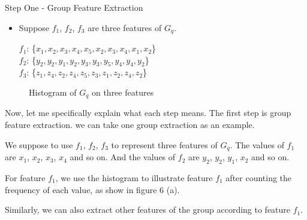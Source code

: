 \documentclass[
 size=14pt,
 paper=smartboard,  %
 mode=present, 		%
 display=slides, 	%
 style=tuliplab,  	%
 pauseslide,
 fleqn,leqno]{powerdot}
\begin{document}
\begin{slide}{Step One - Group Feature Extraction}
\begin{itemize}
\item
\smallskip
Suppose $f_1$, $f_2$, $f_3$ are three features of $G_q$.

$f_1$: \{$x_1, x_2, x_3, x_4, x_5, x_2, x_3, x_4, x_1, x_2$\} \\

$f_2$: \{$y_2, y_2, y_1, y_2, y_3, y_3, y_5, y_4, y_4, y_2$\} \\

$f_3$: \{$z_1, z_4, z_2, z_4, z_5, z_3, z_1, z_2, z_4, z_2$\} \\
\end{itemize}

\begin{figure}[htbp]
    \centering
    \caption{Histogram of $G_q$ on three features}
    \label{fig:fre-dis-each-feature}
\end{figure}

\begin{note}
Now, let me specifically explain what each step means.
The first step is group feature extraction.
we can take one group extraction as an example.

We suppose to use $f_1$, $f_2$, $f_3$ to represent three features of $G_q$.
The values of $f_1$ are {$x_1$, $x_2$, $x_3$, $x_4$} and so on.
And the values of $f_2$ are {$y_2$, $y_2$, $y_1$, $x_2$} and so on.

For feature $f_1$,
we use the histogram to illustrate feature $f_1$ after
counting the frequency of each value,
as show in figure 6 (a).

Similarly,
we can also extract other features of the group
according to feature $f_1$.
\end{note}

\end{slide}
\end{document}
